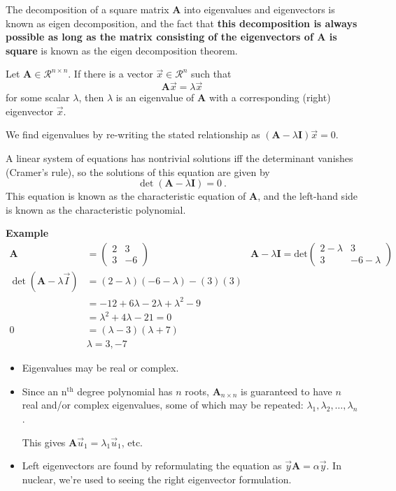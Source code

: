 \documentclass[12pt]{article}
\newcommand{\nth}{n\ensuremath{^{\text{th}}} }
\newcommand{\ve}[1]{\ensuremath{\mathbf{#1}}}
\begin{document}
The decomposition of a square matrix $\ve{A}$ into eigenvalues and eigenvectors is known as eigen decomposition, and the fact that \textbf{this decomposition is always possible as long as the matrix consisting of the eigenvectors of $\ve{A}$ is square} is known as the eigen decomposition theorem.

Let $\ve{A} \in \mathcal{R}^{n \times n}$. If there is a vector $\vec{x} \in \mathcal{R}^{n}$ such that
%
\[\ve{A} \vec{x} = \lambda \vec{x}\]
%
for some scalar $\lambda$, then $\lambda$ is an eigenvalue of $\ve{A}$ with a corresponding (right) eigenvector $\vec{x}$.
 
We find eigenvalues by re-writing the stated relationship as $(\ve{A} - \lambda \ve{I})\vec{x}=0$.

A linear system of equations has nontrivial solutions iff the determinant vanishes (Cramer's rule), so the solutions of this equation are given by
%
\[\det(\ve{A} - \lambda \ve{I})=0 \:.\] 	
%
This equation is known as the characteristic equation of $\ve{A}$, and the left-hand side is known as the characteristic polynomial.

\textbf{Example}
\begin{align}
    \ve{A} &= \begin{pmatrix}
        2 & 3 \\
        3 & -6
    \end{pmatrix} 
    &\ve{A} - \lambda \ve{I} = \text{det}\begin{pmatrix}
        2 - \lambda & 3 \\
        3 & -6 - \lambda
    \end{pmatrix} \nonumber \\
%  
\det(\ve{A} - \lambda \vec{I}) &= (2 - \lambda)(-6 - \lambda) - (3)(3) \nonumber \\
%
&= -12 + 6\lambda -2\lambda + \lambda^2 -9 \nonumber \\
&= \lambda^2 + 4\lambda -21 = 0 \nonumber \\
0 &= (\lambda - 3)(\lambda + 7) \nonumber \\
&\boxed{\lambda = 3, -7} \nonumber
\end{align} 


\begin{itemize}
\item Eigenvalues may be real or complex. 

\item Since an \nth degree polynomial has $n$ roots, $\ve{A}_{n \times n}$ is guaranteed to have $n$ real and/or complex eigenvalues, some of which may be repeated: $\lambda_1, \lambda_2, \dots, \lambda_n$.

This gives $\ve{A}\vec{u}_1 = \lambda_1 \vec{u}_1$, etc.

\item Left eigenvectors are found by reformulating the equation as $\vec{y}\ve{A} = \alpha \vec{y}$. In nuclear, we're used to seeing the right eigenvector formulation.
\end{itemize}
\end{document}

